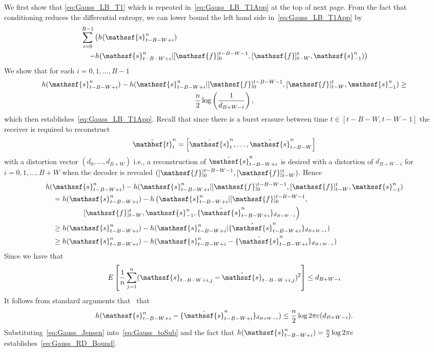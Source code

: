 \documentclass[journal, twocolumn, 10pt]{IEEEtran}
\newcommand{\rvf}{{\mathssf{f}}}    %
\newcommand{\rvs}{{\mathssf{s}}}    %
\newcommand{\rvbt}{{\mathbsf{t}}}
\begin{document}
{We first show that \eqref{eq:Gauss_LB_T1} which is repeated in~\eqref{eq:Gauss_LB_T1App} at the top of next page.
From the fact that conditioning reduces the differential entropy, we can lower bound the left hand side in~\eqref{eq:Gauss_LB_T1App} by
\begin{align}
& \sum_{i=0}^{B-1}\left(h(\rvs_{t-B-W+i}^n)\right.\notag\\&\left.\quad-h(\rvs_{t-B-W+i}^n|[\rvf]_{0}^{{t-B-W-1}}, [\rvf]_{t-W}^{t}, \rvs_{-1}^n)\right)\label{eq:exp3}
\end{align}
We show that for each $i=0,1,\ldots, B-1$
\begin{multline}
h(\rvs_{t-B-W+i}^n)-h(\rvs_{t-B-W+i}^n|[\rvf]_{0}^{{t-B-W-1}}, [\rvf]_{t-W}^{t}, \rvs_{-1}^n)\ge \\  \frac{n}{2}\log \left(\frac{1}{d_{B+W-i}}\right),\label{eq:Gauss_RD_Bound}
\end{multline}
which then establishes~\eqref{eq:Gauss_LB_T1App}.
Recall that since there is a burst erasure between time $t \in [t-B-W, t-W-1]$ the receiver is required to reconstruct 
\begin{align}
\hat{\rvbt}^n_{t} = \left[\hat{\rvs}_{t}^n, \ldots, \hat{\rvs}_{t-B-W}^n\right]
\end{align}
with a distortion vector $(d_0,\ldots, d_{B+W})$ i.e., a reconstruction of $\hat{\rvs}_{t-B-W+i}^n$ is desired with a distortion of $d_{B+W-i}$ for $i=0,1,\ldots, B+W$ when the decoder is revealed $([\rvf]_{0}^{{t-B-W-1}}, [\rvf]_{t-W}^{t})$. Hence
\begin{align}
&h(\rvs_{t-B-W+i}^n) - h(\rvs_{t-B-W+i}^n|[\rvf]_{0}^{{t-B-W-1}}, [\rvf]_{t-W}^{t}, \rvs_{-1}^n)\notag\\
&\quad =h(\rvs_{t-B-W+i}^n) - h\left(\rvs_{t-B-W+i}^n|[\rvf]_{0}^{{t-B-W-1}},\right.\notag\\&\left.\quad \quad \quad \quad \quad [\rvf]_{t-W}^{t}, \rvs_{-1}^n,\{\hat{\rvs}^n_{t-B-W+i}\}_{d_{B+W-i}}\right)\\
&\quad \ge h(\rvs_{t-B-W+i}^n) - h(\rvs_{t-B-W+i}^n|\{\hat{\rvs}^n_{t-B-W+i}\}_{d_{B+W-i}})\\
&\quad \ge h(\rvs_{t-B-W+i}^n) - h(\rvs_{t-B-W+i}^n-\{\hat{\rvs}^n_{t-B-W+i}\}_{d_{B+W-i}})\label{eq:Gauss_toSub}
\end{align}
Since we have that 
\begin{align}
E\left[ \frac{1}{n}\sum_{j=1}^n (\rvs_{t-B-W+i,j}-\hat{\rvs}_{t-B-W+i,j})^2 \right] \le d_{B+W-i}
\end{align}
It follows from standard arguments that~\cite[Chapter 13]{coverThomas} that
\begin{equation}
h(\rvs_{t-B-W+i}^n-\{\hat{\rvs}^n_{t-B-W+i}\}_{d_{B+W-i}}) \le \frac{n}{2}\log {2\pi e}{(d_{B+W-i})}. \label{eq:Gauss_Jensen}
\end{equation}
Substituting~\eqref{eq:Gauss_Jensen} into~\eqref{eq:Gauss_toSub} and the fact that $h(\rvs_{t-B-W+i}^n)= \frac{n}{2}\log 2\pi e$ establishes~\eqref{eq:Gauss_RD_Bound}.

}
\end{document}
